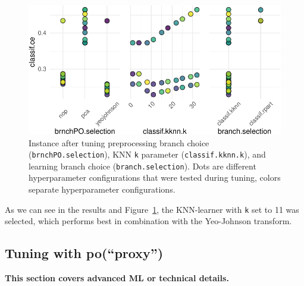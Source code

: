 \begin{figure}

{\centering \includegraphics[width=1\textwidth,height=\textheight]{chapters/chapter8/non-sequential_pipelines_and_tuning_files/figure-pdf/fig-nonseq-instance-1.pdf}

}

\caption{\label{fig-nonseq-instance}Instance after tuning preprocessing
branch choice (\texttt{brnchPO.selection}), KNN \texttt{k} parameter
(\texttt{classif.kknn.k}), and learning branch choice
(\texttt{branch.selection}). Dots are different hyperparameter
configurations that were tested during tuning, colors separate
hyperparameter configurations.}

\end{figure}

As we can see in the results and Figure~\ref{fig-nonseq-instance}, the
KNN-learner with \texttt{k} set to 11 was selected, which performs best
in combination with the Yeo-Johnson transform.

\hypertarget{sec-pipelines-proxy}{%
\subsection{Tuning with po(``proxy'')}\label{sec-pipelines-proxy}}

\begin{tcolorbox}[enhanced jigsaw, colframe=quarto-callout-note-color-frame, rightrule=.15mm, bottomrule=.15mm, toprule=.15mm, opacityback=0, colback=white, left=2mm, arc=.35mm, breakable, leftrule=.75mm]
\begin{minipage}[t]{5.5mm}
\textcolor{quarto-callout-note-color}{\faInfo}
\end{minipage}%
\begin{minipage}[t]{\textwidth - 5.5mm}

\textbf{This section covers advanced ML or technical
details.}\vspace{2mm}

\end{minipage}%
\end{tcolorbox}

